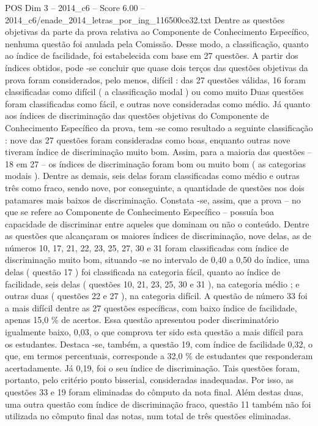 \begin{textsample}{POS Dim 3 – 2014\_c6 – Score 6.00 – 2014\_c6/enade\_2014\_letras\_por\_ing\_116500ce32.txt}
Dentre as questões objetivas da parte da prova relativa ao Componente de Conhecimento Específico, nenhuma questão foi anulada pela Comissão.
Desse modo, a classificação, quanto ao índice de facilidade, foi estabelecida com base em 27 questões.
A partir dos índices obtidos, pode -se concluir que quase dois terços das questões objetivas da prova foram considerados, pelo menos, difícil : das 27 questões válidas, 16 foram classificadas como difícil ( a classificação modal ) ou como muito Duas questões foram classificadas como fácil, e outras nove consideradas como médio.
Já quanto aos índices de discriminação das questões objetivas do Componente de Conhecimento Específico da prova, tem -se como resultado a seguinte classificação : nove das 27 questões foram consideradas como boas, enquanto outras nove tiveram índice de discriminação muito bom.
Assim, para a maioria das questões – 18 em 27 – os índices de discriminação foram bom ou muito bom ( as categorias modais ).
Dentre as demais, seis delas foram classificadas como médio e outras três como fraco, sendo nove, por conseguinte, a quantidade de questões nos dois patamares mais baixos de discriminação.
Constata -se, assim, que a prova – no que se refere ao Componente de Conhecimento Específico – possuía boa capacidade de discriminar entre aqueles que dominam ou não o conteúdo.
Dentre as questões que alcançaram os maiores índices de discriminação, nove delas, as de números 10, 17, 21, 22, 23, 25, 27, 30 e 31 foram classificadas com índice de discriminação muito bom, situando -se no intervalo de 0,40 a 0,50 do índice, uma delas ( questão 17 ) foi classificada na categoria fácil, quanto ao índice de facilidade, seis delas ( questões 10, 21, 23, 25, 30 e 31 ), na categoria médio ; e outras duas ( questões 22 e 27 ), na categoria difícil.
A questão de número 33 foi a mais difícil dentre as 27 questões específicas, com baixo índice de facilidade, apenas 15,0 \% de acertos.
Essa questão apresentou poder discriminatório igualmente baixo, 0,03, o que comprova ter sido esta questão a mais difícil para os estudantes.
Destaca -se, também, a questão 19, com índice de facilidade 0,32, o que, em termos percentuais, corresponde a 32,0 \% de estudantes que responderam acertadamente.
Já 0,19, foi o seu índice de discriminação.
Tais questões foram, portanto, pelo critério ponto bisserial, consideradas inadequadas.
Por isso, as questões 33 e 19 foram eliminadas do cômputo da nota final.
Além destas duas, uma outra questão com índice de discriminação fraco, questão 11 também não foi utilizada no cômputo final das notas, num total de três questões eliminadas.

\end{textsample}

